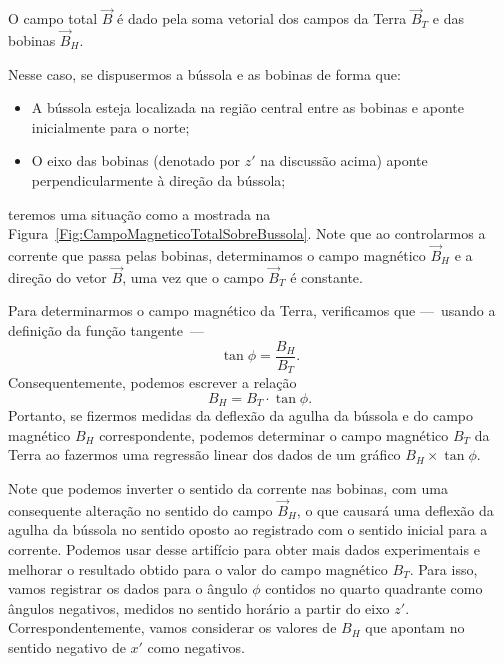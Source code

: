 \begin{marginfigure}
\centering
{}
\caption{O campo total $\vec{B}$ é dado pela soma vetorial dos campos da Terra $\vec{B}_T$ e das bobinas $\vec{B}_H$. \label{Fig:CampoMagneticoTotalSobreBussola}}
\end{marginfigure}

Nesse caso, se dispusermos a bússola e as bobinas de forma que:
\begin{itemize}
    \item A bússola esteja localizada na região central entre as bobinas e aponte inicialmente para o norte;
    \item O eixo das bobinas (denotado por $z'$ na discussão acima) aponte perpendicularmente à direção da bússola;
\end{itemize}
%
teremos uma situação como a mostrada na Figura~\ref{Fig:CampoMagneticoTotalSobreBussola}. Note que ao controlarmos a corrente que passa pelas bobinas, determinamos o campo magnético $\vec{B}_H$ e a direção do vetor $\vec{B}$, uma vez que o campo $\vec{B}_T$ é constante.

Para determinarmos o campo magnético da Terra, verificamos que ---~usando a definição da função tangente~---
\begin{equation}
    \tan \phi = \frac{B_H}{B_T}.
\end{equation}
%
Consequentemente, podemos escrever a relação
\begin{equation}
    B_H = B_T \cdot \tan \phi.
\end{equation}
%
Portanto, se fizermos medidas da deflexão da agulha da bússola e do campo magnético $B_H$ correspondente, podemos determinar o campo magnético $B_T$ da Terra ao fazermos uma regressão linear dos dados de um gráfico $B_H \times \tan\phi$.

Note que podemos inverter o sentido da corrente nas bobinas, com uma consequente alteração no sentido do campo $\vec{B}_H$, o que causará uma deflexão da agulha da bússola no sentido oposto ao registrado com o sentido inicial para a corrente. Podemos usar desse artifício para obter mais dados experimentais e melhorar o resultado obtido para o valor do campo magnético $B_T$. Para isso, vamos registrar os dados para o ângulo $\phi$ contidos no quarto quadrante como ângulos negativos, medidos no sentido horário a partir do eixo $z'$. Correspondentemente, vamos considerar os valores de $B_H$ que apontam no sentido negativo de $x'$ como negativos.


